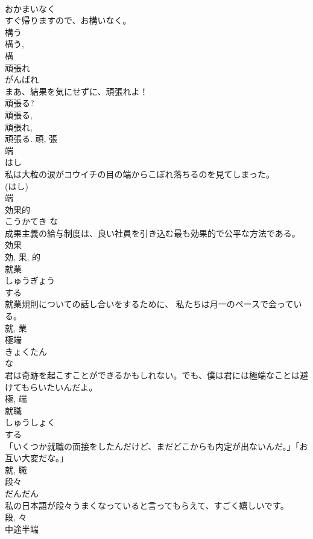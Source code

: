 \documentclass[8pt]{extreport}
\begin{document}
\begin{CJK}{UTF8}{min}
\\	おかまいなく	
\\	すぐ帰りますので、お構いなく。	
\\	構う 
\\	構う, 
\\	構	
\\	頑張れ	
\\	がんばれ	
\\	まあ、結果を気にせずに、頑張れよ！	
\\	頑張る? 
\\	頑張る, 
\\	頑張れ, 
\\	頑張る.	頑, 張	
\\	端	
\\	はし	
\\	私は大粒の涙がコウイチの目の端からこぼれ落ちるのを見てしまった。	
\\	(はし) 
\\	端	
\\	効果的	
\\	こうかてき	な 
\\	成果主義の給与制度は、良い社員を引き込む最も効果的で公平な方法である。	
\\	効果 
\\	効, 果, 的	
\\	就業	
\\	しゅうぎょう	
\\	する 
\\	就業規則についての話し合いをするために、 私たちは月一のペースで会っている。	
\\	就, 業	
\\	極端	
\\	きょくたん	
\\	な 
\\	君は奇跡を起こすことができるかもしれない。でも、僕は君には極端なことは避けてもらいたいんだよ。	
\\	極, 端	
\\	就職	
\\	しゅうしょく	
\\	する 
\\	「いくつか就職の面接をしたんだけど、まだどこからも内定が出ないんだ。」「お互い大変だな。」	
\\	就, 職	
\\	段々	
\\	だんだん	
\\	私の日本語が段々うまくなっていると言ってもらえて、すごく嬉しいです。	
\\	段, 々	
\\	中途半端	

\end{CJK}
\end{document}
